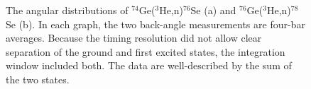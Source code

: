 \begin{figure}[!htbp]
\centering
{}
\caption{The angular distributions of $^{74}$Ge($^3$He,n)$^{76}$Se (a) and $^{76}$Ge($^3$He,n)$^{78}$Se (b).  In each graph, the two back-angle measurements are four-bar averages.  Because the timing resolution did not allow clear separation of the ground and first excited states, the integration window included both.  The data are well-described by the sum of the two states.}
\label{fig:PS_angularDistribution}
\end{figure}
 
